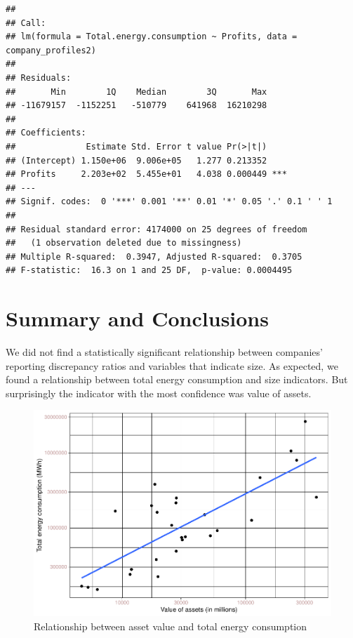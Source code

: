 \documentclass[
  12pt,
]{article}
\begin{document}
\begin{verbatim}
## 
## Call:
## lm(formula = Total.energy.consumption ~ Profits, data = company_profiles2)
## 
## Residuals:
##       Min        1Q    Median        3Q       Max 
## -11679157  -1152251   -510779    641968  16210298 
## 
## Coefficients:
##              Estimate Std. Error t value Pr(>|t|)    
## (Intercept) 1.150e+06  9.006e+05   1.277 0.213352    
## Profits     2.203e+02  5.455e+01   4.038 0.000449 ***
## ---
## Signif. codes:  0 '***' 0.001 '**' 0.01 '*' 0.05 '.' 0.1 ' ' 1
## 
## Residual standard error: 4174000 on 25 degrees of freedom
##   (1 observation deleted due to missingness)
## Multiple R-squared:  0.3947, Adjusted R-squared:  0.3705 
## F-statistic:  16.3 on 1 and 25 DF,  p-value: 0.0004495
\end{verbatim}

\newpage

\hypertarget{summary-and-conclusions}{%
\section{Summary and Conclusions}\label{summary-and-conclusions}}

We did not find a statistically significant relationship between
companies' reporting discrepancy ratios and variables that indicate
size. As expected, we found a relationship between total energy
consumption and size indicators. But surprisingly the indicator with the
most confidence was value of assets.

\begin{figure}
\centering
\includegraphics{BoothProphete_Report_files/figure-latex/plot1-1.pdf}
\caption{Relationship between asset value and total energy consumption}
\end{figure}
\end{document}
